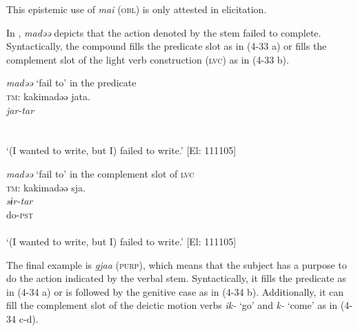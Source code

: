 This epistemic use of \textit{mai} (\textsc{obl}) is only attested in elicitation.

In , \textit{madəə} depicts that the action denoted by the stem failed to complete. Syntactically, the compound fills the predicate slot as in (4-33 a) or fills the complement slot of the light verb construction (\textsc{lvc}) as in (4-33 b).

\ea \label{ex:4.33}
\ea \textit{madəə} ‘fail to’ in the predicate \label{ex:4.33a}\\
\textsc{tm}: \gllll    kakimadəə  jata.\\
    \textit{}  \textit{jar-tar}\\
    [write-\textsc{inf}+fail.to  \textsc{cop}-\textsc{pst}]\\
    [Nominal predicate]\\
  \glt     ‘(I wanted to write, but I) failed to write.’ [El: 111105]

\ex \textit{madəə} ‘fail to’ in the complement slot of \textsc{lvc}\\
\textsc{tm}: \gllll    kakimadəə  sja.\\
    \textit{}  \textit{sɨr-tar}\\
    [write-\textsc{inf}+fail.to]  do-\textsc{pst}\\
    [Complement]  \\
  \glt     ‘(I wanted to write, but I) failed to write.’ [El: 111105]
  \z
\z

The final example is \textit{gjaa} (\textsc{purp}), which means that the subject has a purpose to do the action indicated by the verbal stem. Syntactically, it fills the predicate as in (4-34 a) or is followed by the genitive case as in (4-34 b). Additionally, it can fill the complement slot of the deictic motion verbs \textit{ik-} ‘go’ and \textit{k-} ‘come’ as in (4-34 c-d).

